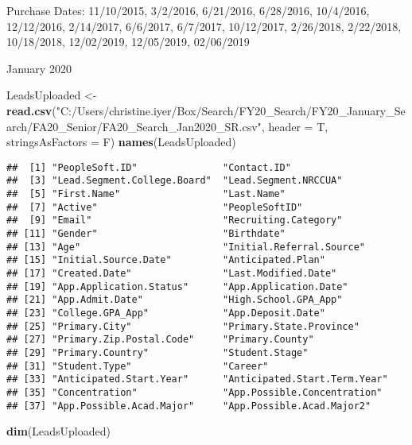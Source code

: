 \documentclass[
]{article}
\newenvironment{Shaded}{\begin{snugshade}}{\end{snugshade}}
\newcommand{\DataTypeTok}[1]{\textcolor[rgb]{0.13,0.29,0.53}{#1}}
\newcommand{\KeywordTok}[1]{\textcolor[rgb]{0.13,0.29,0.53}{\textbf{#1}}}
\newcommand{\NormalTok}[1]{#1}
\newcommand{\StringTok}[1]{\textcolor[rgb]{0.31,0.60,0.02}{#1}}
\begin{document}
Purchase Dates: 11/10/2015, 3/2/2016, 6/21/2016, 6/28/2016, 10/4/2016,
12/12/2016, 2/14/2017, 6/6/2017, 6/7/2017, 10/12/2017, 2/26/2018,
2/22/2018, 10/18/2018, 12/02/2019, 12/05/2019, 02/06/2019

January 2020

\begin{Shaded}
\begin{Highlighting}[]
\NormalTok{LeadsUploaded <-}\StringTok{ }\KeywordTok{read.csv}\NormalTok{(}\StringTok{"C:/Users/christine.iyer/Box/Search/FY20_Search/FY20_January_Search/FA20_Senior/FA20_Search_Jan2020_SR.csv"}\NormalTok{, }\DataTypeTok{header =}\NormalTok{ T, }\DataTypeTok{stringsAsFactors =}\NormalTok{ F)}
\KeywordTok{names}\NormalTok{(LeadsUploaded)}
\end{Highlighting}
\end{Shaded}

\begin{verbatim}
##  [1] "PeopleSoft.ID"               "Contact.ID"                 
##  [3] "Lead.Segment.College.Board"  "Lead.Segment.NRCCUA"        
##  [5] "First.Name"                  "Last.Name"                  
##  [7] "Active"                      "PeopleSoftID"               
##  [9] "Email"                       "Recruiting.Category"        
## [11] "Gender"                      "Birthdate"                  
## [13] "Age"                         "Initial.Referral.Source"    
## [15] "Initial.Source.Date"         "Anticipated.Plan"           
## [17] "Created.Date"                "Last.Modified.Date"         
## [19] "App.Application.Status"      "App.Application.Date"       
## [21] "App.Admit.Date"              "High.School.GPA_App"        
## [23] "College.GPA_App"             "App.Deposit.Date"           
## [25] "Primary.City"                "Primary.State.Province"     
## [27] "Primary.Zip.Postal.Code"     "Primary.County"             
## [29] "Primary.Country"             "Student.Stage"              
## [31] "Student.Type"                "Career"                     
## [33] "Anticipated.Start.Year"      "Anticipated.Start.Term.Year"
## [35] "Concentration"               "App.Possible.Concentration" 
## [37] "App.Possible.Acad.Major"     "App.Possible.Acad.Major2"
\end{verbatim}

\begin{Shaded}
\begin{Highlighting}[]
\KeywordTok{dim}\NormalTok{(LeadsUploaded)}
\end{Highlighting}
\end{Shaded}
\end{document}
